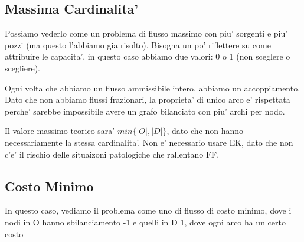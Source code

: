 \subsection{Massima Cardinalita'}
Possiamo vederlo come un problema di flusso massimo con piu' sorgenti e piu' pozzi (ma questo l'abbiamo gia risolto). Bisogna un po' riflettere su come attribuire le capacita', in questo caso abbiamo due valori: 0 o 1 (non sceglere o scegliere). 

Ogni volta che abbiamo un flusso ammissibile intero, abbiamo un accoppiamento. Dato che non abbiamo flussi frazionari, la proprieta' di unico arco e' rispettata perche' sarebbe impossibile avere un grafo bilanciato con piu' archi per nodo. 


Il valore massimo teorico sara' $ min \{|O|, |D|\} $, dato che non hanno necessariamente la stessa cardinalita'. Non e' necessario usare EK, dato che non c'e' il rischio delle situaizoni patologiche che rallentano FF. 

\subsection{Costo Minimo}
In questo caso, vediamo il problema come uno di flusso di costo minimo, dove i nodi in O hanno sbilanciamento -1 e quelli in D 1, dove ogni arco ha un certo costo 

